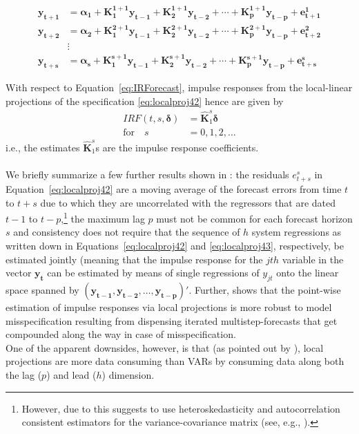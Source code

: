 \documentclass[a4paper,11pt,listof=nochaptergap,oneside,pointednumbers,bibtotoc,bigheadings,liststotoc]{scrbook}
\theoremstyle{mysatz}
\theoremstyle{mydefinition}
\theoremstyle{mybemerkung}
\let\oldhat\hat
\newcommand{\vect}[1]{\boldsymbol{\mathbf{#1}}}
\newcommand{\hatt}[1]{\oldhat{\boldsymbol{\mathbf{#1}}}}
\begin{document}
\begin{itemize}
\begin{equation} \label{eq:localproj43}
\begin{split}
	\vect{y_{t+1}} & = \vect{\alpha_1} + \vect{K_1^{1+1}}\vect{y_{t-1}} + \vect{K_2^{1+1}}\vect{y_{t-2}} + \cdots + \vect{K_p^{1+1}}\vect{y_{t-p}} + \vect{e_{t+1}^1} \\
	\vect{y_{t+2}} & = \vect{\alpha_2} + \vect{K_1^{2+1}}\vect{y_{t-1}} + \vect{K_2^{2+1}}\vect{y_{t-2}} + \cdots + \vect{K_p^{2+1}}\vect{y_{t-p}} + \vect{e_{t+2}^2} \\
	& \vdots \\
	\vect{y_{t+s}} & = \vect{\alpha_s} + \vect{K_1^{s+1}}\vect{y_{t-1}} + \vect{K_2^{s+1}}\vect{y_{t-2}} + \cdots + \vect{K_p^{s+1}}\vect{y_{t-p}} + \vect{e_{t+s}^s}
\end{split}								
\end{equation}

With respect to Equation~\ref{eq:IRForecast}, impulse responses from the local-linear projections of the specification \ref{eq:localproj42} hence are given by
\begin{equation}\label{eq:IRFLocProjDefinition}
\begin{split}
	IRF(t, s, \vect{\delta}) & = {\hatt{K}_1^s}\vect{\delta}  \\
	\text{for} \quad s & = 0, 1, 2, \dots
\end{split}
\end{equation}
i.e., the estimates ${\hatt{K}_1^s}$s are the impulse response coefficients.\\
\\
We briefly summarize a few further results shown in \citet{jorda:05}: the residuals $e_{t+s}^s$ in Equation~\ref{eq:localproj42} are a moving average of the forecast errors from time $t$ to $t+s$ due to which they are uncorrelated with the regressors that are dated $t-1$ to $t-p$,\footnote{However, due to this \citet{jorda:05} suggests to use heteroskedasticity and autocorrelation consistent estimators for the variance-covariance matrix (see, e.g., \citealp{newest:87}).} the maximum lag $p$ must not be common for each forecast horizon $s$ and consistency does not require that the sequence of $h$ system regressions as written down in Equations~\ref{eq:localproj42} and \ref{eq:localproj43}, respectively, be estimated jointly (meaning that the impulse response for the $jth$ variable in the vector $\vect{y_t}$ can be estimated by means of single regressions of $y_{jt}$ onto the linear space spanned by $(\vect{y_{t-1}}, \vect{y_{t-2}}, \dots, \vect{y_{t-p}})'$. Further, \citet{jorda:05} shows that the point-wise estimation of impulse responses via local projections is more robust to model misspecification resulting from dispensing iterated multistep-forecasts that get compounded along the way in case of misspecification.\\
One of the apparent downsides, however, is that (as pointed out by \citealp{brugnolini:18}), local projections are more data consuming than VARs by consuming data along both the lag ($p$) and lead ($h$) dimension.


\end{itemize}
\end{document}
